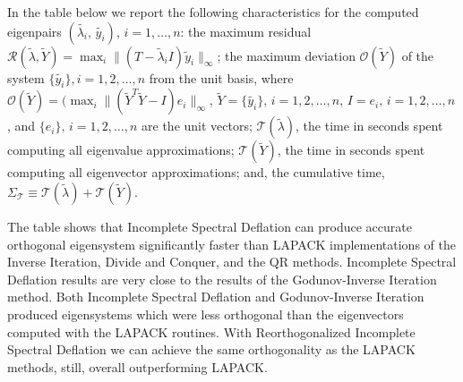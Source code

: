 \documentclass{report}
\begin{document}
In the table below we report the following characteristics for
the computed eigenpairs
$(\tilde{\lambda_i},\,\tilde{y_i}),\,i=1,\ldots, n$: the maximum
residual $\mathcal{R}(\tilde{\lambda}, \tilde{Y}) = \max_i \| (T
- \tilde{\lambda}_i I) \tilde{y}_i \|_\infty$; the maximum
deviation $\mathcal{O}(\tilde{Y})$ of the system
$\{\tilde{y_i}\}, i = 1, 2, \ldots, n$ from the unit basis, where
$\mathcal{O}(\tilde{Y})=(\max_i \|(\tilde{Y}^T \tilde{Y} - I)
e_i\|_\infty$, $\tilde{Y} = \{\tilde{y_i}\},\, i = 1, 2, \ldots,
n$, $I = {e_i},\, i = 1, 2, \ldots, n$, and $\{e_i\},\, i = 1, 2,
\ldots, n$ are the unit vectors; $\mathcal{T}( \tilde{\lambda})$,
the time in seconds spent computing all eigenvalue
approximations; $\mathcal{T}( \tilde{Y})$, the time in seconds
spent computing all eigenvector approximations; and, the
cumulative time, $\Sigma_{\mathcal{T}} \equiv
\mathcal{T}(\tilde{\lambda}) + \mathcal{T}( \tilde{Y})$.

\begin{table}[hbtp]
\centering
{}
\label{tbl:TestNew}
\end{table}

The table shows that Incomplete Spectral Deflation can produce
accurate orthogonal eigensystem significantly faster than LAPACK
implementations of the Inverse Iteration, Divide and Conquer, and
the QR methods. Incomplete Spectral Deflation results are very
close to the results of the Godunov-Inverse Iteration
method. Both Incomplete Spectral Deflation and Godunov-Inverse
Iteration produced eigensystems which were less orthogonal than
the eigenvectors computed with the LAPACK routines. With
Reorthogonalized Incomplete Spectral Deflation we can achieve the
same orthogonality as the LAPACK methods, still, overall
outperforming LAPACK.
\end{document}
